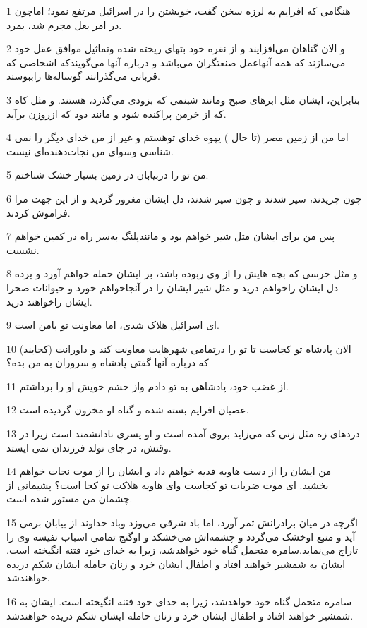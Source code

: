 \par 1 هنگامی که افرایم به لرزه سخن گفت، خویشتن را در اسرائیل مرتفع نمود؛ اماچون در امر بعل مجرم شد، بمرد.
\par 2 و الان گناهان می‌افزایند و از نقره خود بتهای ریخته شده وتماثیل موافق عقل خود می‌سازند که همه آنهاعمل صنعتگران می‌باشد و درباره آنها می‌گویندکه اشخاصی که قربانی می‌گذرانند گوساله‌ها راببوسند.
\par 3 بنابراین، ایشان مثل ابرهای صبح ومانند شبنمی که بزودی می‌گذرد، هستند. و مثل کاه که از خرمن پراکنده شود و مانند دود که ازروزن برآید.
\par 4 اما من از زمین مصر (تا حال ) یهوه خدای توهستم و غیر از من خدای دیگر را نمی شناسی وسوای من نجات‌دهنده‌ای نیست.
\par 5 من تو را دربیابان در زمین بسیار خشک شناختم.
\par 6 چون چریدند، سیر شدند و چون سیر شدند، دل ایشان مغرور گردید و از این جهت مرا فراموش کردند.
\par 7 پس من برای ایشان مثل شیر خواهم بود و مانندپلنگ به‌سر راه در کمین خواهم نشست.
\par 8 و مثل خرسی که بچه هایش را از وی ربوده باشد، بر ایشان حمله خواهم آورد و پرده دل ایشان راخواهم درید و مثل شیر ایشان را در آنجاخواهم خورد و حیوانات صحرا ایشان راخواهند درید.
\par 9 ‌ای اسرائیل هلاک شدی، اما معاونت تو بامن است.
\par 10 الان پادشاه تو کجاست تا تو را درتمامی شهرهایت معاونت کند و داورانت (کجایند) که درباره آنها گفتی پادشاه و سروران به من بده؟
\par 11 از غضب خود، پادشاهی به تو دادم واز خشم خویش او را برداشتم.
\par 12 عصیان افرایم بسته شده و گناه او مخزون گردیده است.
\par 13 دردهای زه مثل زنی که می‌زاید بروی آمده است و او پسری نادانشمند است زیرا در وقتش، در جای تولد فرزندان نمی ایستد.
\par 14 من ایشان را از دست هاویه فدیه خواهم داد و ایشان را از موت نجات خواهم بخشید. ای موت ضربات تو کجاست و‌ای هاویه هلاکت تو کجا است؟ پشیمانی از چشمان من مستور شده است.
\par 15 اگر‌چه در میان برادرانش ثمر آورد، اما باد شرقی می‌وزد وباد خداوند از بیابان برمی آید و منبع اوخشک می‌گردد و چشمه‌اش می‌خشکد و اوگنج تمامی اسباب نفیسه وی را تاراج می‌نماید.سامره متحمل گناه خود خواهدشد، زیرا به خدای خود فتنه انگیخته است. ایشان به شمشیر خواهند افتاد و اطفال ایشان خرد و زنان حامله ایشان شکم دریده خواهندشد.
\par 16 سامره متحمل گناه خود خواهدشد، زیرا به خدای خود فتنه انگیخته است. ایشان به شمشیر خواهند افتاد و اطفال ایشان خرد و زنان حامله ایشان شکم دریده خواهندشد.

